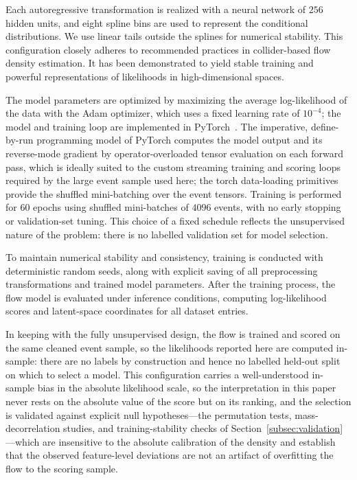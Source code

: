 \documentclass[11pt,a4paper,twocolumn]{article}
\begin{document}
Each autoregressive transformation is realized with a neural network of $256$ hidden units, and eight spline bins are used to represent the conditional distributions. We use linear tails outside the splines for numerical stability. This configuration closely adheres to recommended practices in collider-based flow density estimation. It has been demonstrated to yield stable training and powerful representations of likelihoods in high-dimensional spaces.

The model parameters are optimized by maximizing the average log-likelihood of the data with the Adam optimizer, which uses a fixed learning rate of $10^{-4}$; the model and training loop are implemented in PyTorch~\cite{Paszke2019PyTorch}. The imperative, define-by-run programming model of PyTorch computes the model output and its reverse-mode gradient by operator-overloaded tensor evaluation on each forward pass, which is ideally suited to the custom streaming training and scoring loops required by the large event sample used here; the torch data-loading primitives provide the shuffled mini-batching over the event tensors. Training is performed for $60$ epochs using shuffled mini-batches of $4096$ events, with no early stopping or validation-set tuning. This choice of a fixed schedule reflects the unsupervised nature of the problem: there is no labelled validation set for model selection.

To maintain numerical stability and consistency, training is conducted with deterministic random seeds, along with explicit saving of all preprocessing transformations and trained model parameters. After the training process, the flow model is evaluated under inference conditions, computing log-likelihood scores and latent-space coordinates for all dataset entries.

In keeping with the fully unsupervised design, the flow is trained and scored on the same cleaned event sample, so the likelihoods reported here are computed in-sample: there are no labels by construction and hence no labelled held-out split on which to select a model. This configuration carries a well-understood in-sample bias in the absolute likelihood scale, so the interpretation in this paper never rests on the absolute value of the score but on its ranking, and the selection is validated against explicit null hypotheses---the permutation tests, mass-decorrelation studies, and training-stability checks of Section~\ref{subsec:validation}---which are insensitive to the absolute calibration of the density and establish that the observed feature-level deviations are not an artifact of overfitting the flow to the scoring sample.
\end{document}
